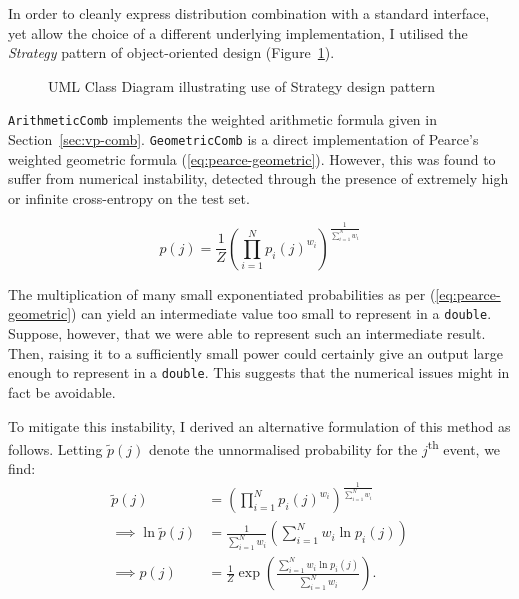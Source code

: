 \documentclass[12pt,a4paper,twoside,openright]{report}
\begin{document}
In order to cleanly express distribution combination with a standard interface,
yet allow the choice of a different underlying implementation, I utilised the
\emph{Strategy} pattern of object-oriented design
(Figure~\ref{fig:dist-strategy-uml}).

\begin{figure}[H]
\centering
\caption{UML Class Diagram illustrating use of Strategy design pattern}
\label{fig:dist-strategy-uml}
\end{figure}

\texttt{ArithmeticComb} implements the weighted arithmetic formula given in
Section~\ref{sec:vp-comb}. \texttt{GeometricComb} is a direct implementation of
Pearce's weighted geometric formula (\ref{eq:pearce-geometric}). However, this
was found to suffer from numerical instability, detected through the presence of
extremely high or infinite cross-entropy on the test set. 

\begin{equation}
p(j) = \frac{1}{Z} \left( \prod_{i = 1}^N p_i(j)^{w_i} \right)^{ \frac{1}{
\sum_{i = 1}^N w_i }} \label{eq:pearce-geometric}
\end{equation}

The multiplication of many small exponentiated probabilities as per
(\ref{eq:pearce-geometric}) can yield an intermediate value too small to
represent in a \texttt{double}. Suppose, however, that we were able to represent
such an intermediate result. Then, raising it to a sufficiently small power
could certainly give an output large enough to represent in a \texttt{double}.
This suggests that the numerical issues might in fact be avoidable.

To mitigate this instability, I derived an alternative formulation of this
method as follows. Letting $\widetilde{p}(j)$ denote the unnormalised
probability for the $j$\textsuperscript{th} event, we find:
\begin{align*}
  \widetilde{p}(j) &= \left( \prod_{i=1}^N p_i(j)^{w_i}
  \right)^{\frac{1}{\sum_{i=1}^N w_i}} \\[3mm]
  \implies \ln{\widetilde{p}(j)} &= \frac{1}{\sum_{i = 1}^N w_i} \left( \sum_{i
  = 1}^N w_i \ln{p_i(j)} \right) \\[3mm]
  \implies p(j) &= \frac{1}{Z} \exp \left( \frac{\sum_{i = 1}^N w_i \ln{ p_i(j)
  }}{ \sum_{i = 1}^N w_i } \right).
\end{align*}
\end{document}
